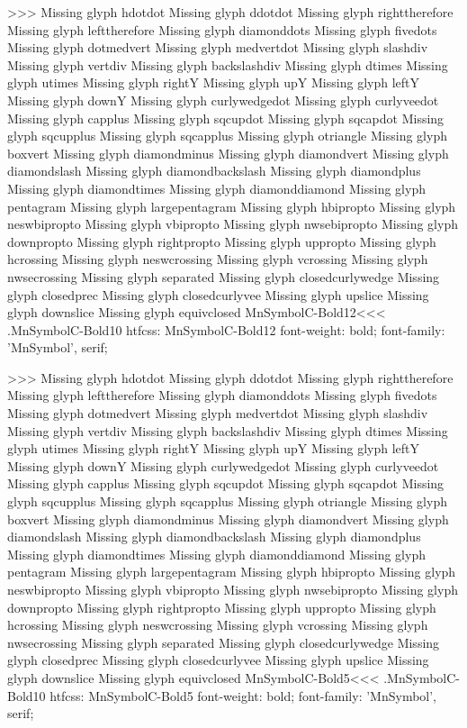 >>>
Missing glyph	hdotdot
Missing glyph	ddotdot
Missing glyph	righttherefore
Missing glyph	lefttherefore
Missing glyph	diamonddots
Missing glyph	fivedots
Missing glyph	dotmedvert
Missing glyph	medvertdot
Missing glyph	slashdiv
Missing glyph	vertdiv
Missing glyph	backslashdiv
Missing glyph	dtimes
Missing glyph	utimes
Missing glyph	rightY
Missing glyph	upY
Missing glyph	leftY
Missing glyph	downY
Missing glyph	curlywedgedot
Missing glyph	curlyveedot
Missing glyph	capplus
Missing glyph	sqcupdot
Missing glyph	sqcapdot
Missing glyph	sqcupplus
Missing glyph	sqcapplus
Missing glyph	otriangle
Missing glyph	boxvert
Missing glyph	diamondminus
Missing glyph	diamondvert
Missing glyph	diamondslash
Missing glyph	diamondbackslash
Missing glyph	diamondplus
Missing glyph	diamondtimes
Missing glyph	diamonddiamond
Missing glyph	pentagram
Missing glyph	largepentagram
Missing glyph	hbipropto
Missing glyph	neswbipropto
Missing glyph	vbipropto
Missing glyph	nwsebipropto
Missing glyph	downpropto
Missing glyph	rightpropto
Missing glyph	uppropto
Missing glyph	hcrossing
Missing glyph	neswcrossing
Missing glyph	vcrossing
Missing glyph	nwsecrossing
Missing glyph	separated
Missing glyph	closedcurlywedge
Missing glyph	closedprec
Missing glyph	closedcurlyvee
Missing glyph	upslice
Missing glyph	downslice
Missing glyph	equivclosed
\<MnSymbolC-Bold12\><<<
.MnSymbolC-Bold10
htfcss:  MnSymbolC-Bold12  font-weight: bold; font-family: 'MnSymbol', serif;

>>>
Missing glyph	hdotdot
Missing glyph	ddotdot
Missing glyph	righttherefore
Missing glyph	lefttherefore
Missing glyph	diamonddots
Missing glyph	fivedots
Missing glyph	dotmedvert
Missing glyph	medvertdot
Missing glyph	slashdiv
Missing glyph	vertdiv
Missing glyph	backslashdiv
Missing glyph	dtimes
Missing glyph	utimes
Missing glyph	rightY
Missing glyph	upY
Missing glyph	leftY
Missing glyph	downY
Missing glyph	curlywedgedot
Missing glyph	curlyveedot
Missing glyph	capplus
Missing glyph	sqcupdot
Missing glyph	sqcapdot
Missing glyph	sqcupplus
Missing glyph	sqcapplus
Missing glyph	otriangle
Missing glyph	boxvert
Missing glyph	diamondminus
Missing glyph	diamondvert
Missing glyph	diamondslash
Missing glyph	diamondbackslash
Missing glyph	diamondplus
Missing glyph	diamondtimes
Missing glyph	diamonddiamond
Missing glyph	pentagram
Missing glyph	largepentagram
Missing glyph	hbipropto
Missing glyph	neswbipropto
Missing glyph	vbipropto
Missing glyph	nwsebipropto
Missing glyph	downpropto
Missing glyph	rightpropto
Missing glyph	uppropto
Missing glyph	hcrossing
Missing glyph	neswcrossing
Missing glyph	vcrossing
Missing glyph	nwsecrossing
Missing glyph	separated
Missing glyph	closedcurlywedge
Missing glyph	closedprec
Missing glyph	closedcurlyvee
Missing glyph	upslice
Missing glyph	downslice
Missing glyph	equivclosed
\<MnSymbolC-Bold5\><<<
.MnSymbolC-Bold10
htfcss:  MnSymbolC-Bold5  font-weight: bold; font-family: 'MnSymbol', serif;

